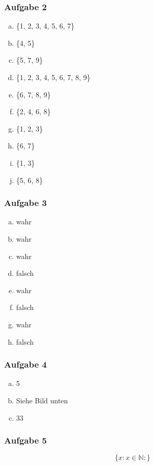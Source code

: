 \documentclass[12pt, a4paper, oneside]{article}
\begin{document}
\subsubsection{Aufgabe 2}
\begin{enumerate}[(a)]
  \item \{1, 2, 3, 4, 5, 6, 7\}
  \item \{4, 5\}
  \item \{5, 7, 9\}
  \item \{1, 2, 3, 4, 5, 6, 7, 8, 9\}
  \item \{6, 7, 8, 9\}
  \item \{2, 4, 6, 8\}
  \item \{1, 2, 3\}
  \item \{6, 7\}
  \item \{1, 3\}
  \item \{5, 6, 8\}
\end{enumerate}

\subsubsection{Aufgabe 3}
\begin{enumerate}[(a)]
  \item wahr
  \item wahr
  \item wahr
  \item falsch
  \item wahr
  \item falsch
  \item wahr
  \item falsch
\end{enumerate}

\subsubsection{Aufgabe 4} 
\begin{enumerate}[(a)]
  \item 5
  \item Siehe Bild unten
  \item 33
\end{enumerate}

\subsubsection{Aufgabe 5}
\begin{equation*}
  \{x : x \in \mathbb{N} : \}
\end{equation*}
\end{document}
